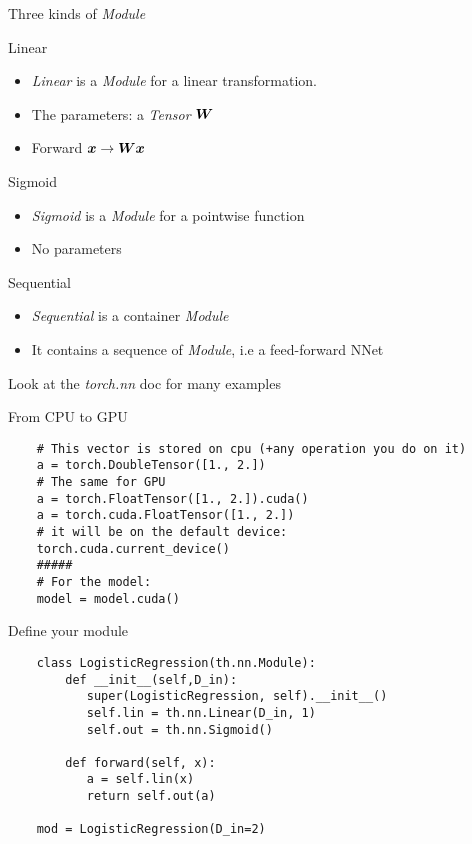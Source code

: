 \begin{frame}{Three kinds of \textit{Module}}

  
  \begin{block}{Linear}
    \begin{itemize}
    \item \textit{Linear} is a \textit{Module} for a linear
      transformation.
    \item The parameters: a \textit{Tensor} $\boldsymbol{W}$
    \item Forward $\boldsymbol{x}\rightarrow \boldsymbol{W}\boldsymbol{x}$
    \end{itemize}
  \end{block}


  \begin{block}{Sigmoid}
    \begin{itemize}
    \item \textit{Sigmoid} is a \textit{Module} for a pointwise function
    \item No parameters
    \end{itemize}
  \end{block}

  \begin{block}{Sequential}
    \begin{itemize}
    \item \textit{Sequential} is a container \textit{Module} 
    \item It contains a sequence of \textit{Module}, i.e a feed-forward NNet
    \end{itemize}
  \end{block}
  \begin{center}
    Look at the \textit{torch.nn} doc for many examples
  \end{center}
\end{frame}



\begin{frame}[fragile]{From CPU to GPU}
  \begin{verbatim}
    # This vector is stored on cpu (+any operation you do on it)
    a = torch.DoubleTensor([1., 2.])
    # The same for GPU
    a = torch.FloatTensor([1., 2.]).cuda()
    a = torch.cuda.FloatTensor([1., 2.])
    # it will be on the default device: 
    torch.cuda.current_device()
    #####
    # For the model: 
    model = model.cuda()
  \end{verbatim}
\end{frame}

\begin{frame}[fragile]{Define your module}
  \begin{verbatim}
    class LogisticRegression(th.nn.Module):
        def __init__(self,D_in):
           super(LogisticRegression, self).__init__()
           self.lin = th.nn.Linear(D_in, 1)
           self.out = th.nn.Sigmoid()    
    
        def forward(self, x): 
           a = self.lin(x)
           return self.out(a)
           
    mod = LogisticRegression(D_in=2)
  \end{verbatim}
\end{frame}




